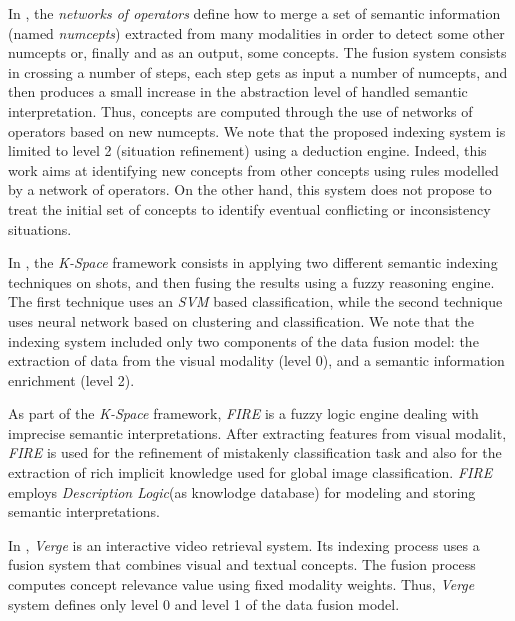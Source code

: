 		In \citep{Ayache2007c,Ayache2007b}, the \emph{networks of operators} define how to merge a set of semantic information 
		(named \textit{numcepts}) extracted from 
		many modalities in order to detect some other numcepts or, finally and as an output, 
		some concepts. The fusion system consists in crossing  a number of steps, each step gets as input a number of numcepts, 
		and then produces a small increase in the abstraction level of handled semantic interpretation. 
		Thus, concepts are computed through the use of networks of operators based on new numcepts.
		We note that the proposed indexing system is limited to level 2 (situation refinement) using
		a deduction engine. Indeed, this work aims at identifying new concepts from other concepts using rules modelled 
		by a network of operators. On the other hand, this system does not propose to treat the initial set of concepts 
		to identify eventual conflicting or inconsistency situations.

		In \citep{Athanasiadis2009}, the \emph{K-Space} framework consists in applying two different semantic 
		indexing techniques on shots, and then fusing the results 
		using a fuzzy reasoning engine. The first technique uses an \emph{SVM} based classification, while the second 
		technique uses neural network based on clustering and classification.
		We note that the indexing system included only two components of the data fusion model: the extraction 
		of data from the visual modality (level 0), and a semantic information enrichment (level 2).

		As part of the \emph{K-Space} framework, \emph{FIRE} \citep{Simou2007,Simou2008} is a fuzzy logic engine 
		dealing with imprecise semantic interpretations. After extracting features from visual modalit, 
		\emph{FIRE} is used for the refinement of 
		mistakenly classification task and also for the extraction of rich implicit knowledge used for global image classification.
		\emph{FIRE} employs \textit{Description Logic}(as knowlodge database) for modeling and storing semantic interpretations.

			In \citep{Vrochidis2010}, \emph{Verge} is an interactive video retrieval system. Its indexing process 
			uses a fusion system that combines visual and textual concepts. The fusion process computes
			concept relevance value using fixed modality weights. Thus, \emph{Verge} system defines only 
			level 0 and level 1 of the data fusion model.



